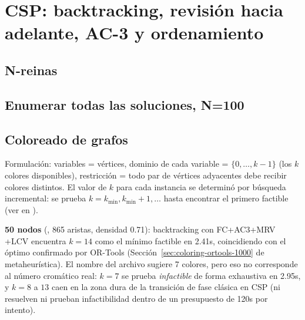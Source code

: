 \section{CSP: backtracking, revisi\'on hacia adelante, AC-3 y ordenamiento}


\subsection{N-reinas}

\subsection{Enumerar todas las soluciones, N=100}

\subsection{Coloreado de grafos}
\label{sec:coloring-backtracking-1000}

Formulación: variables = vértices, dominio de cada variable = $\{0, \dots, k-1\}$ (los $k$
colores disponibles), restricción = todo par de vértices adyacentes debe recibir colores
distintos. El valor de $k$ para cada instancia se determinó por búsqueda incremental: se prueba
$k = k_{\min}, k_{\min}+1, \dots$ hasta encontrar el primero factible (ver
 en ).

\textbf{50 nodos} (, 865 aristas, densidad 0.71): backtracking con FC+AC3+MRV
+LCV encuentra $k=14$ como el mínimo factible en 2.41s, coincidiendo con el óptimo confirmado por
OR-Tools (Sección~\ref{sec:coloring-ortools-1000} de metaheurística). El nombre del archivo
sugiere 7 colores, pero eso no corresponde al número cromático real: $k=7$ se prueba
\emph{infactible} de forma exhaustiva en 2.95s, y $k=8$ a $13$ caen en la zona dura de la
transición de fase clásica en CSP (ni resuelven ni prueban infactibilidad dentro de un
presupuesto de 120s por intento).

